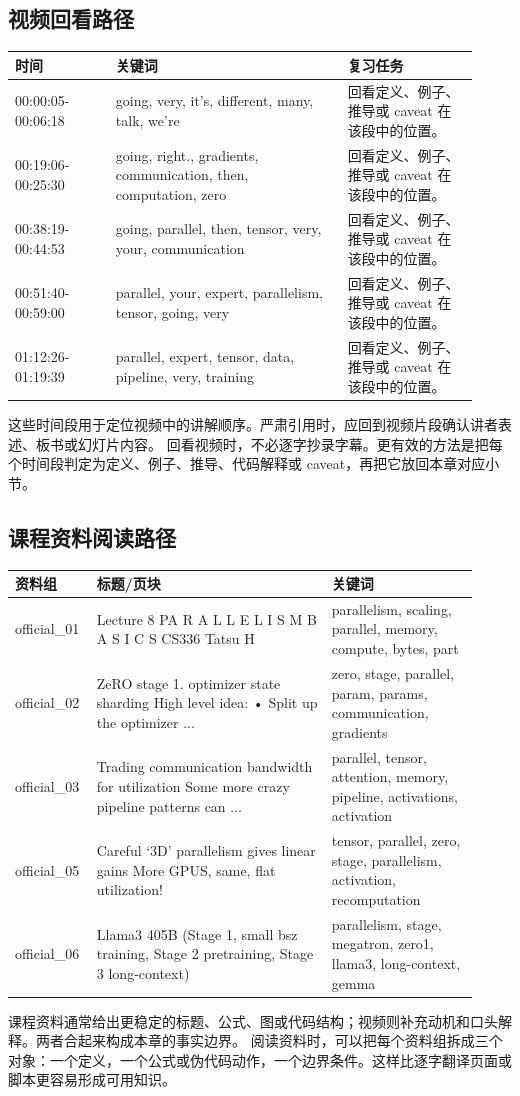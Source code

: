 \documentclass[a4paper]{article}
\begin{document}
\subsection{视频回看路径}
\begin{longtable}{p{0.20\linewidth}p{0.46\linewidth}p{0.26\linewidth}}
\toprule
\textbf{时间} & \textbf{关键词} & \textbf{复习任务}\\
\midrule
00:00:05-00:06:18 & going, very, it's, different, many, talk, we're & 回看定义、例子、推导或 caveat 在该段中的位置。\\
00:19:06-00:25:30 & going, right., gradients, communication, then, computation, zero & 回看定义、例子、推导或 caveat 在该段中的位置。\\
00:38:19-00:44:53 & going, parallel, then, tensor, very, your, communication & 回看定义、例子、推导或 caveat 在该段中的位置。\\
00:51:40-00:59:00 & parallel, your, expert, parallelism, tensor, going, very & 回看定义、例子、推导或 caveat 在该段中的位置。\\
01:12:26-01:19:39 & parallel, expert, tensor, data, pipeline, very, training & 回看定义、例子、推导或 caveat 在该段中的位置。\\
\bottomrule
\end{longtable}
这些时间段用于定位视频中的讲解顺序。严肃引用时，应回到视频片段确认讲者表述、板书或幻灯片内容。
回看视频时，不必逐字抄录字幕。更有效的方法是把每个时间段判定为定义、例子、推导、代码解释或 caveat，再把它放回本章对应小节。
\subsection{课程资料阅读路径}
\begin{longtable}{p{0.14\linewidth}p{0.48\linewidth}p{0.30\linewidth}}
\toprule
\textbf{资料组} & \textbf{标题/页块} & \textbf{关键词}\\
\midrule
official\_01 & Lecture 8 PA R A L L E L I S M B A S I C S CS336 Tatsu H & parallelism, scaling, parallel, memory, compute, bytes, part\\
official\_02 & ZeRO stage 1. optimizer state sharding High level idea: • Split up the optimizer ... & zero, stage, parallel, param, params, communication, gradients\\
official\_03 & Trading communication bandwidth for utilization Some more crazy pipeline patterns can ... & parallel, tensor, attention, memory, pipeline, activations, activation\\
official\_05 & Careful ‘3D’ parallelism gives linear gains More GPUS, same, flat utilization! & tensor, parallel, zero, stage, parallelism, activation, recomputation\\
official\_06 & Llama3 405B (Stage 1, small bsz training, Stage 2 pretraining, Stage 3 long-context) & parallelism, stage, megatron, zero1, llama3, long-context, gemma\\
\bottomrule
\end{longtable}
课程资料通常给出更稳定的标题、公式、图或代码结构；视频则补充动机和口头解释。两者合起来构成本章的事实边界。
阅读资料时，可以把每个资料组拆成三个对象：一个定义，一个公式或伪代码动作，一个边界条件。这样比逐字翻译页面或脚本更容易形成可用知识。
\end{document}
